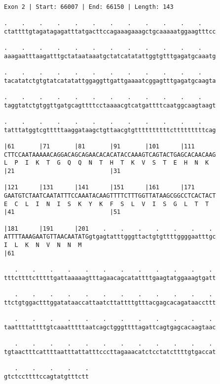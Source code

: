 \documentclass{article}
\begin{document}
\begin{Verbatim}
Exon 2 | Start: 66007 | End: 66150 | Length: 143
 
.    .    .    .    .    .    .    .    .    .    .    .    
ctattttgtagatagagatttatgacttccagaaagaaagctgcaaaaatggaagtttcc
  
.    .    .    .    .    .    .    .    .    .    .    .    
aaagaatttaagatttgctataataaatgctatcatatattggtgtttgagatgcaaatg
  
.    .    .    .    .    .    .    .    .    .    .    .    
tacatatctgtgtatcatatattggaggttgattgaaaatcggagtttgagatgcaagta
  
.    .    .    .    .    .    .    .    .    .    .    .    
taggtatctgtggttgatgcagttttcctaaaacgtcatgattttcaatggcaagtaagt
  
.    .    .    .    .    .    .    .    .    .    .    .    
tatttatggtcgtttttaaggataagctgttaacgtgttttttttttctttttttttcag
  
|61       |71       |81       |91       |101      |111      
CTTCCAATAAAAACAGGACAGCAGAACACACATACCAAAGTCAGTACTGAGCACAACAAG
L  P  I  K  T  G  Q  Q  N  T  H  T  K  V  S  T  E  H  N  K  
|21                           |31                           
  
|121      |131      |141      |151      |161      |171      
GAATGTCTAATCAATATTTCCAAATACAAGTTTTCTTTGGTTATAAGCGGCCTCACTACT
E  C  L  I  N  I  S  K  Y  K  F  S  L  V  I  S  G  L  T  T  
|41                           |51                           
  
|181      |191      |201    .    .    .    .    .    .    . 
ATTTTAAAGAATGTTAACAATATGgtgagtatttgggttactgtgttttggggaatttgc
I  L  K  N  V  N  N  M                                      
|61                                                         
  
   .    .    .    .    .    .    .    .    .    .    .    . 
tttcttttctttttgattaaaaagtttagaacagcatattttgaagtatggaaagtgatt
  
   .    .    .    .    .    .    .    .    .    .    .    . 
ttctgtggactttggatataaccattaatcttattttgtttacgagcacagataaccttt
  
   .    .    .    .    .    .    .    .    .    .    .    . 
taattttattttgtcaaatttttaatcagctgggttttagattcagtgagcacaagtaac
  
   .    .    .    .    .    .    .    .    .    .    .    . 
tgtaactttcattttaatttattatttcccttagaaacatctcctatcttttgtgaccat
  
   .    .    .    .    .
gtctccttttccagtatgtttctt
\end{Verbatim}
\newpage
\end{document}
